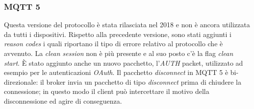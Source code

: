 \documentclass[binding=0.6cm,TFA]{sapthesis}
\begin{document}
\begin{large}
\subsubsection{MQTT 5}
Questa versione del protocollo è stata rilasciata nel 2018 e non è ancora utilizzata da tutti i dispositivi. Rispetto alla precedente versione, sono stati aggiunti i \textit{reason codes} i quali riportano il tipo di errore relativo al protocollo che è avvenuto. La \textit{clean session} non è più presente e al suo posto c'è la flag \textit{clean start}. È stato aggiunto anche un nuovo pacchetto, l'\textit{AUTH} packet, utilizzato ad esempio per le autenticazioni \textit{OAuth}. Il pacchetto \textit{disconnect} in MQTT 5 è bi-direzionale: il broker invia un pacchetto di tipo \textit{disconnect} prima di chiudere la connessione; in questo modo il client può intercettare il motivo della disconnessione ed agire di conseguenza.

\end{large}
\end{document}

